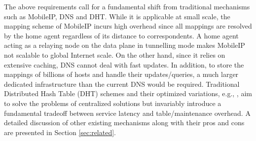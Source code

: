 




The above requirements call for a fundamental shift from traditional
mechanisms such as MobileIP, DNS and DHT.
While it is applicable at small scale, the mapping scheme of MobileIP
incurs high overhead since all mappings are resolved by the home agent
regardless of its distance to correspondents. A home agent acting as a
relaying node on the data plane in tunnelling mode makes MobileIP not
scalable to global Internet scale. On the other hand, since it relies
on extensive caching, DNS cannot deal with fast updates. In addition,
to store the mappings of billions of hosts and handle their
updates/queries, a much larger dedicated infrastructure than
the current DNS would be required. Traditional Distributed Hash
Table (DHT) schemes and their optimized variations, e.g., \cite{monnerat,
  gupta}, aim to solve the problems of centralized solutions but
invariably introduce a fundamental tradeoff between service latency
and table/maintenance overhead.
  A detailed discussion of other existing mechanisms along with their pros and cons are presented in Section \ref{sec:related}.   
